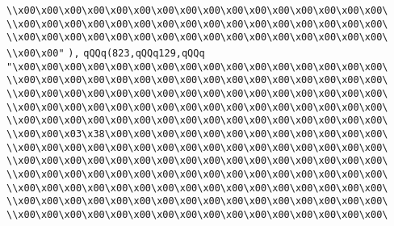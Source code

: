 \verb|\\x00\x00\x00\x00\x00\x00\x00\x00\x00\x00\x00\x00\x00\x00\x00\x00\|\newline
\verb|\\x00\x00\x00\x00\x00\x00\x00\x00\x00\x00\x00\x00\x00\x00\x00\x00\|\newline
\verb|\\x00\x00\x00\x00\x00\x00\x00\x00\x00\x00\x00\x00\x00\x00\x00\x00\|\newline
\verb|\\x00\x00"|\newline
\verb|),|\newline
\verb|qQQq(823,qQQq129,qQQq|\newline
\verb|"\x00\x00\x00\x00\x00\x00\x00\x00\x00\x00\x00\x00\x00\x00\x00\x00\|\newline
\verb|\\x00\x00\x00\x00\x00\x00\x00\x00\x00\x00\x00\x00\x00\x00\x00\x00\|\newline
\verb|\\x00\x00\x00\x00\x00\x00\x00\x00\x00\x00\x00\x00\x00\x00\x00\x00\|\newline
\verb|\\x00\x00\x00\x00\x00\x00\x00\x00\x00\x00\x00\x00\x00\x00\x00\x00\|\newline
\verb|\\x00\x00\x00\x00\x00\x00\x00\x00\x00\x00\x00\x00\x00\x00\x00\x00\|\newline
\verb|\\x00\x00\x03\x38\x00\x00\x00\x00\x00\x00\x00\x00\x00\x00\x00\x00\|\newline
\verb|\\x00\x00\x00\x00\x00\x00\x00\x00\x00\x00\x00\x00\x00\x00\x00\x00\|\newline
\verb|\\x00\x00\x00\x00\x00\x00\x00\x00\x00\x00\x00\x00\x00\x00\x00\x00\|\newline
\verb|\\x00\x00\x00\x00\x00\x00\x00\x00\x00\x00\x00\x00\x00\x00\x00\x00\|\newline
\verb|\\x00\x00\x00\x00\x00\x00\x00\x00\x00\x00\x00\x00\x00\x00\x00\x00\|\newline
\verb|\\x00\x00\x00\x00\x00\x00\x00\x00\x00\x00\x00\x00\x00\x00\x00\x00\|\newline
\verb|\\x00\x00\x00\x00\x00\x00\x00\x00\x00\x00\x00\x00\x00\x00\x00\x00\|\newline
